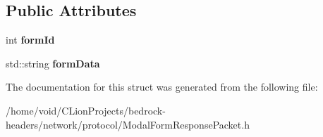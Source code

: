 \subsection*{Public Attributes}
\begin{DoxyCompactItemize}
\item 
\mbox{\label{struct_modal_form_response_packet_a17817c494e82adcd2451bde79c9e12d5}} 
int {\bfseries form\+Id}
\item 
\mbox{\label{struct_modal_form_response_packet_a44d3e0c90bc43a4482320fed9e8447ab}} 
std\+::string {\bfseries form\+Data}
\end{DoxyCompactItemize}


The documentation for this struct was generated from the following file\+:\begin{DoxyCompactItemize}
\item 
/home/void/\+C\+Lion\+Projects/bedrock-\/headers/network/protocol/Modal\+Form\+Response\+Packet.\+h\end{DoxyCompactItemize}
